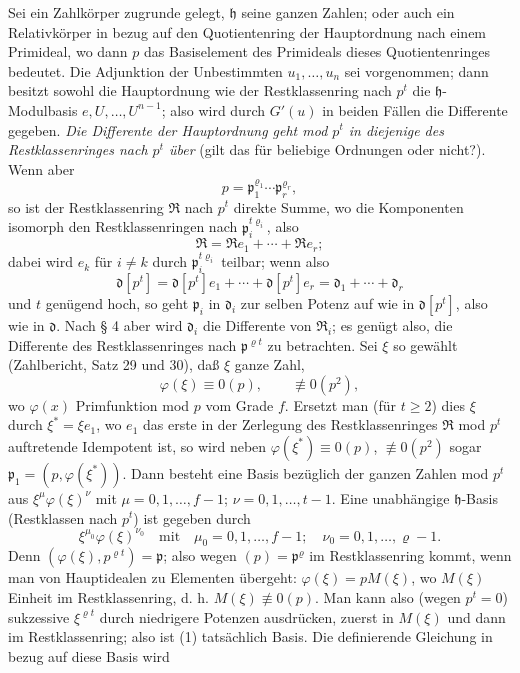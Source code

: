 Sei ein Zahlkörper zugrunde gelegt, $\mathfrak h$ seine ganzen Zahlen; oder auch ein Relativkörper in bezug auf den Quotientenring der Hauptordnung nach einem Primideal, wo dann $p$ das Basiselement des Primideals dieses Quotientenringes bedeutet. Die Adjunktion der Unbestimmten $u_1,\ldots,u_n$ sei vorgenommen; dann besitzt sowohl die Hauptordnung wie der Restklassenring nach $p^t$ die $\mathfrak h$-Modulbasis $e,U,\ldots,U^{n-1}$; also wird durch $G'(u)$ in beiden Fällen die Differente gegeben. \emph{Die Differente der Hauptordnung geht mod $p^t$ in diejenige des Restklassenringes nach $p^t$ über} (gilt das für beliebige Ordnungen oder nicht?). Wenn aber
\[
p=\mathfrak p_1^{\varrho_1}\cdots\mathfrak p_r^{\varrho_r},
\]
so ist der Restklassenring $\mathfrak R$ nach $p^t$ direkte Summe, wo die Komponenten isomorph den Restklassenringen nach $\mathfrak p_i^{t\varrho_i}$, also
\[
\mathfrak R=\mathfrak R e_1+\cdots+\mathfrak R e_r;
\]
dabei wird $e_k$ für $i\ne k$ durch $\mathfrak p_i^{t\varrho_i}$ teilbar; wenn also
\[
\mathfrak d[p^t]=\mathfrak d[p^t]e_1+\cdots+\mathfrak d[p^t]e_r
=\mathfrak d_1+\cdots+\mathfrak d_r
\]
und $t$ genügend hoch, so geht $\mathfrak p_i$ in $\mathfrak d_i$ zur selben Potenz auf wie in $\mathfrak d[p^t]$, also wie in $\mathfrak d$. Nach § 4 aber wird $\mathfrak d_i$ die Differente von $\mathfrak R_i$; es genügt also, die Differente des Restklassenringes nach $\mathfrak p^{\varrho t}$ zu betrachten. Sei $\xi$ so gewählt (Zahlbericht, Satz 29 und 30), daß $\xi$ ganze Zahl,
\[
\varphi(\xi)\equiv0(p),
\qquad \not\equiv0(p^2),
\]
wo $\varphi(x)$ Primfunktion mod $p$ vom Grade $f$. Ersetzt man (für $t\ge2$) dies $\xi$ durch $\xi^*=\xi e_1$, wo $e_1$ das erste in der Zerlegung des Restklassenringes $\mathfrak R$ mod $p^t$ auftretende Idempotent ist, so wird neben $\varphi(\xi^*)\equiv0(p)$, $\not\equiv0(p^2)$ sogar $\mathfrak p_1=(p,\varphi(\xi^*))$. Dann besteht eine Basis bezüglich der ganzen Zahlen mod $p^t$ aus $\xi^\mu\varphi(\xi)^\nu$ mit $\mu=0,1,\ldots,f-1$; $\nu=0,1,\ldots,t-1$. Eine unabhängige $\mathfrak h$-Basis (Restklassen nach $p^t$) ist gegeben durch
\begin{equation}
\xi^{\mu_0}\varphi(\xi)^{\nu_0}
\quad\text{mit}\quad
\mu_0=0,1,\ldots,f-1;
\quad \nu_0=0,1,\ldots,\varrho-1. \tag{1}
\end{equation}
Denn $(\varphi(\xi),p^{\varrho t})=\mathfrak p$; also wegen $(p)=\mathfrak p^\varrho$ im Restklassenring kommt, wenn man von Hauptidealen zu Elementen übergeht: $\varphi(\xi)=pM(\xi)$, wo $M(\xi)$ Einheit im Restklassenring, d. h. $M(\xi)\not\equiv0(p)$. Man kann also (wegen $p^t=0$) sukzessive $\xi^{\varrho t}$ durch niedrigere Potenzen ausdrücken, zuerst in $M(\xi)$ und dann im Restklassenring; also ist (1) tatsächlich Basis. Die definierende Gleichung in bezug auf diese Basis wird
